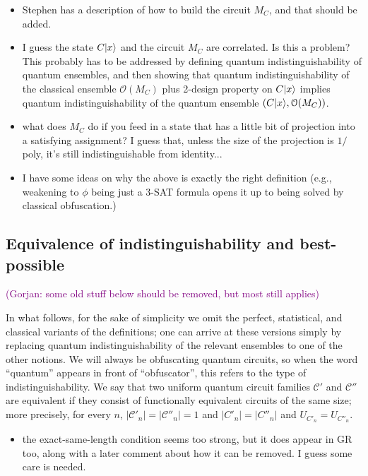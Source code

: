 \documentclass[11pt]{article}
\numberwithin{equation}{section}
\newcommand{\ga}[1]{{ \textcolor{purple}{(Gorjan:  #1)}}{}}
\begin{document}
\begin{itemize}
\item Stephen has a description of how to build the circuit $M_C$, and that should be added.
\item I guess the state $C {\left\vert{x}\right\rangle}$ and the circuit $M_C$ are correlated. Is this a problem? This probably has to be addressed by defining quantum indistinguishability of quantum ensembles, and then showing that quantum indistinguishability of the classical ensemble $\mathcal O(M_C)$ plus 2-design property on $C {\left\vert{x}\right\rangle}$ implies quantum indistinguishability of the quantum ensemble $(C {\left\vert{x}\right\rangle}, \mathcal O(M_C))$.
\item what does $M_C$ do if you feed in a state that has a little bit of projection into a satisfying assignment? I guess that, unless the size of the projection is $1/$poly, it's still indistinguishable from identity...
\item I have some ideas on why the above is exactly the right definition (e.g., weakening to $\phi$ being just a 3-SAT formula opens it up to being solved by classical obfuscation.) 
\end{itemize}

\subsection{Equivalence of indistinguishability and best-possible}

\ga{some old stuff below should be removed, but most still applies}

In what follows, for the sake of simplicity we omit the perfect, statistical, and classical variants of the definitions; one can arrive at these versions simply by replacing quantum indistinguishability of the relevant ensembles to one of the other notions. We will always be obfuscating quantum circuits, so when the word ``quantum'' appears in front of ``obfuscator'', this refers to the type of indistinguishability. We say that two uniform quantum circuit families $\mathcal C'$ and $\mathcal C''$ are equivalent if they consist of functionally equivalent circuits of the same size; more precisely, for every $n$, $|\mathcal C'_n| = |\mathcal C''_n| = 1$ and $|C'_n| = |C''_n|$  and $U_{C'_n} = U_{C''_n}$.

\begin{itemize}
\item the exact-same-length condition seems too strong, but it does appear in GR too, along with a later comment about how it can be removed. I guess some care is needed.
\end{itemize}
\end{document}
